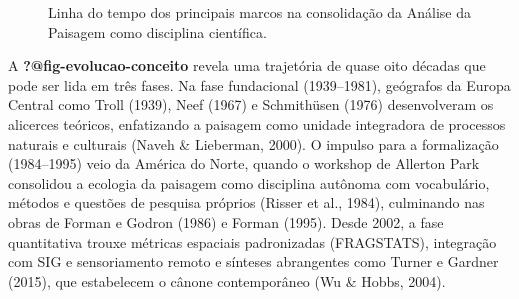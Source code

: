 \documentclass[
  portuguese,
  11pt,
  a4paper,
  open=any]{scrbook}
\begin{document}
\begin{figure}[H]
\caption{Linha do tempo dos principais marcos na consolida\c{c}\~{a}o da An\'{a}lise da Paisagem como disciplina cient\'{i}fica.}
\label{fig-evolucao-conceito}
\end{figure}

A \textbf{?@fig-evolucao-conceito} revela uma trajetória de quase oito
décadas que pode ser lida em três fases. Na fase fundacional
(1939--1981), geógrafos da Europa Central como Troll (1939), Neef (1967)
e Schmithüsen (1976) desenvolveram os alicerces teóricos, enfatizando a
paisagem como unidade integradora de processos naturais e culturais
(Naveh \& Lieberman, 2000). O impulso para a formalização (1984--1995)
veio da América do Norte, quando o workshop de Allerton Park consolidou
a ecologia da paisagem como disciplina autônoma com vocabulário, métodos
e questões de pesquisa próprios (Risser et al., 1984), culminando nas
obras de Forman e Godron (1986) e Forman (1995). Desde 2002, a fase
quantitativa trouxe métricas espaciais padronizadas (FRAGSTATS),
integração com SIG e sensoriamento remoto e sínteses abrangentes como
Turner e Gardner (2015), que estabelecem o cânone contemporâneo (Wu \&
Hobbs, 2004).
\end{document}

